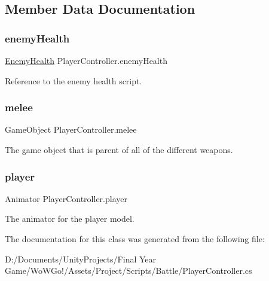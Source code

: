 \subsection{Member Data Documentation}
\mbox{\label{class_player_controller_a1b009736f936d8ddb20ec86b8c694fba}} 
\subsubsection{\texorpdfstring{enemyHealth}{enemyHealth}}
{\footnotesize\ttfamily \mbox{\hyperlink{class_enemy_health}{Enemy\+Health}} Player\+Controller.\+enemy\+Health}



Reference to the enemy health script. 

\mbox{\label{class_player_controller_a4b87339adc04e87928d5b6903d07ec1e}} 
\subsubsection{\texorpdfstring{melee}{melee}}
{\footnotesize\ttfamily Game\+Object Player\+Controller.\+melee}



The game object that is parent of all of the different weapons. 

\mbox{\label{class_player_controller_aac0180b11bcec5b39fb92d0b49634f63}} 
\subsubsection{\texorpdfstring{player}{player}}
{\footnotesize\ttfamily Animator Player\+Controller.\+player}



The animator for the player model. 



The documentation for this class was generated from the following file\+:\begin{DoxyCompactItemize}
\item 
D\+:/\+Documents/\+Unity\+Projects/\+Final Year Game/\+Wo\+W\+Go!/\+Assets/\+Project/\+Scripts/\+Battle/Player\+Controller.\+cs\end{DoxyCompactItemize}
